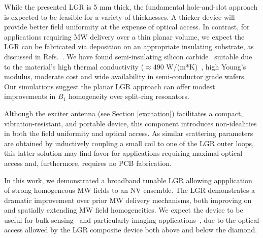 While the presented LGR is 5 mm thick, the fundamental hole-and-slot approach is expected to be feasible for a variety of thicknesses. A thicker device will provide better field uniformity at the expense of optical access. In contrast, for applications requiring MW delivery over a thin planar volume, we expect the LGR can be fabricated via deposition on an appropriate insulating substrate, as discussed in Refs.~\cite{twig2013ultra,twig2010sensitive}. We have found semi-insulating silicon carbide~\cite{schloss2018simultaneous} suitable due to the material's high thermal conductivity ($\approx$490 W/(m*K)~\cite{protik2017phonon,qian2017anisotropic}, high Young's modulus, moderate cost and wide availability in semi-conductor grade wafers. Our simulations suggest the planar LGR approach can offer modest improvements in $B_1$ homogeneity over split-ring resonators. 


Although the exciter antenna (see Section \ref{excitation}) facilitates a compact, vibration-resistant, and portable device, this component introduces non-idealities in both the field uniformity and optical access. As similar scattering parameters are obtained by inductively coupling a small coil to one of the LGR outer loops, this latter solution may find favor for applications requiring maximal optical access and, furthermore, requires no PCB fabrication.


In this work, we demonstrated a broadband tunable LGR allowing appplication of strong homogeneous MW fields to an NV ensemble. The LGR demonstrates a dramatic improvement over prior MW delivery mechanisms, both improving on and spatially extending MW field homogeneities. We expect the device to be useful for bulk sensing~\cite{acosta2009diamonds,wolf2015subpicotesla,clevenson2015broadband,chatzidrosos2017miniature,barry2016optical} and particularly imaging applications~\cite{karaveli2016modulation,glenn2015single,barry2016optical,lesage2013optical,wu2016diamond,fu2014solar,glenn2017micrometer}, due to the optical access allowed by the LGR composite device both above and below the diamond.




